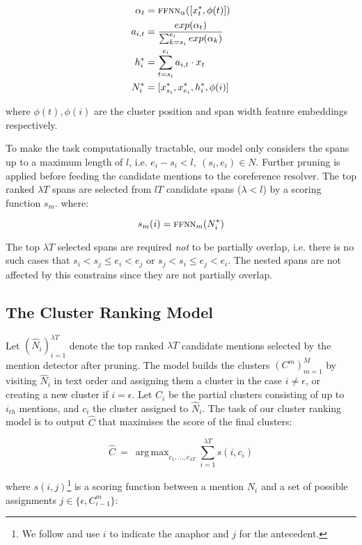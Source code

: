 \documentclass[10pt, a4paper]{article}
\DeclareMathOperator*{\argmax}{arg\,max}
\begin{document}
\vspace{-10pt}
\small
\begin{align*}
\alpha_t &= \textsc{ffnn}_{\alpha}([x^{*}_{t}, \phi(t)])\\
a_{i,t} &= \frac{exp(\alpha_t)}{\sum^{e_i}_{k=s_i} exp(\alpha_k)}\\
h^*_i &= \sum^{e_i}_{t=s_i} a_{i,t} \cdot x_t\\
N^*_i &= [x^*_{s_i}, x^*_{e_i},h^*_i,\phi(i)]
\end{align*}
\normalsize

where $\phi(t), \phi(i)$ are the cluster position and span width feature embeddings respectively.

To make the task computationally tractable, our model only considers the spans up to a maximum length of $l$, i.e. $e_i -  s_i < l, \ (s_i,e_i) \in N$. Further pruning is applied before feeding the candidate mentions to the coreference resolver. 
The top ranked $\lambda T$ spans are selected from $lT$ candidate spans ($\lambda < l$) by a scoring function $s_m$. where:

\small
$$s_m(i) =\textsc{ffnn}_{m} (N^*_i) $$
\normalsize

The top $\lambda T$ selected spans are required \textit{not} to be partially overlap, i.e. there is no such cases that $s_i < s_j \leq e_i < e_j$ or $s_j < s_i \leq e_j < e_i$. The nested spans are not affected by this constrains since they are not partially overlap. 


\subsection{The Cluster Ranking Model}
Let $(\hat{N}_i)_{i=1}^{\lambda T}$ denote the top ranked $\lambda T$ candidate mentions selected by the mention detector after pruning. 
The model builds the clusters $(C^m)_{m=1}^M$ by visiting $\hat{N}_i$ in  text order and assigning them a cluster in the case  $i \neq \epsilon$, or creating a new cluster if $i = \epsilon$. 
Let $C_{i}$ be the partial clusters consisting of up to $i_{th}$ mentions, and $c_i$  the cluster assigned to $\hat{N}_i$. 
The task of our cluster ranking model is to output $\hat{C}$ that maximises the score of the final clusters:

\small
$$
\hat{C}\ =\ \argmax_{c_1,...,c_{\lambda T}}\sum_{i=1}^{\lambda T} s(i, c_i)
$$
\normalsize

where $s(i,j)$\footnote{We follow  and use $i$ to indicate the anaphor and $j$ for the antecedent.} is a scoring function between a mention $N_i$ and a set of possible assignments $j \in \{\epsilon, C^m_{i-1}\}$:
\end{document}
